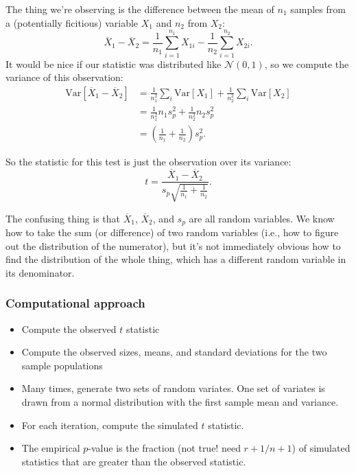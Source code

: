 The thing we're observing is the difference between the mean of \(n_1\)
samples from a (potentially ficitious) variable \(X_1\) and \(n_2\) from
\(X_2\): \[
\overline{X}_1 - \overline{X}_2 = \frac{1}{n_1} \sum_{i=1}^{n_1} X_{1i} - \frac{1}{n_2} \sum_{i=1}^{n_2} X_{2i}.
\] It would be nice if our statistic was distributed like
\(\mathcal{N}(0, 1)\), so we compute the variance of this observation:
\[
\begin{aligned}
\mathrm{Var}\left[ \overline{X}_1 - \overline{X}_2 \right]
  &= \frac{1}{n_1^2} \sum_i \mathrm{Var}[X_1] + \frac{1}{n_2^2} \sum_i \mathrm{Var}[X_2] \\
  &= \frac{1}{n_1^2} n_1 s_p^2 + \frac{1}{n_2^2} n_2 s_p^2 \\
  &= \left( \frac{1}{n_1} + \frac{1}{n_2} \right) s_p^2.
\end{aligned}
\]

So the statistic for this test is just the observation over its
variance: \[
t = \frac{\overline{X}_1 - \overline{X}_2}{s_p \sqrt{\frac{1}{n_1} + \frac{1}{n_2}}}.
\]

The confusing thing is that \(\overline{X}_1\), \(\overline{X}_2\), and
\(s_p\) are all random variables. We know how to take the sum (or
difference) of two random variables (i.e., how to figure out the
distribution of the numerator), but it's not immediately obvious how to
find the distribution of the whole thing, which has a different random
variable in its denominator.

\subsubsection{Computational approach}\label{computational-approach}

\begin{itemize}
\tightlist
\item
  Compute the observed \(t\) statistic
\item
  Compute the observed sizes, means, and standard deviations for the two
  sample populations
\item
  Many times, generate two sets of random variates. One set of variates
  is drawn from a normal distribution with the first sample mean and
  variance.
\item
  For each iteration, compute the simulated \(t\) statistic.
\item
  The empirical \(p\)-value is the fraction (not true! need \(r+1/n+1\))
  of simulated statistics that are greater than the observed statistic.
\end{itemize}

